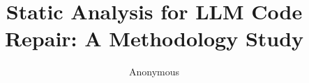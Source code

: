 \documentclass{article}
\title{Static Analysis for LLM Code Repair: A Methodology Study}
\author{Anonymous}
\date{}
\begin{document}
\maketitle

\begin{abstract}

\end{abstract}













\end{document}
